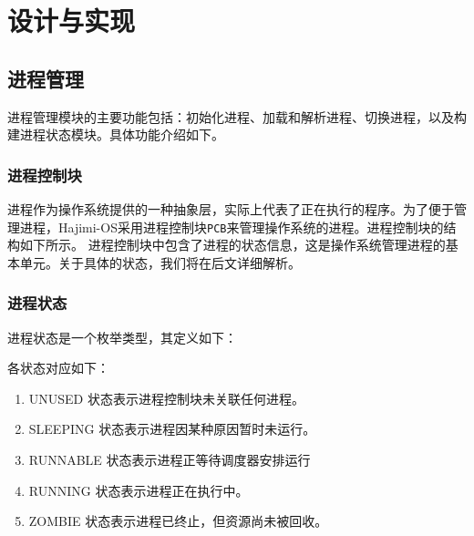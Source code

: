 \documentclass[UTF8]{article}
\begin{document}
\section{设计与实现}
\subsection{进程管理}
进程管理模块的主要功能包括：初始化进程、加载和解析进程、切换进程，以及构建进程状态模块。具体功能介绍如下。
\subsubsection{进程控制块}
进程作为操作系统提供的一种抽象层，实际上代表了正在执行的程序。为了便于管理进程，Hajimi-OS采用进程控制块\texttt{PCB}来管理操作系统的进程。进程控制块的结构如下所示。
进程控制块中包含了进程的状态信息，这是操作系统管理进程的基本单元。关于具体的状态，我们将在后文详细解析。

\subsubsection{进程状态}
进程状态是一个枚举类型，其定义如下：

各状态对应如下：
\begin{enumerate}[label=\textbf{\arabic*}., wide, labelwidth=!, labelindent=0pt]
  \item UNUSED 状态表示进程控制块未关联任何进程。
  \item SLEEPING 状态表示进程因某种原因暂时未运行。
  \item RUNNABLE 状态表示进程正等待调度器安排运行
  \item RUNNING 状态表示进程正在执行中。
  \item ZOMBIE 状态表示进程已终止，但资源尚未被回收。
\end{enumerate}
\end{document}
